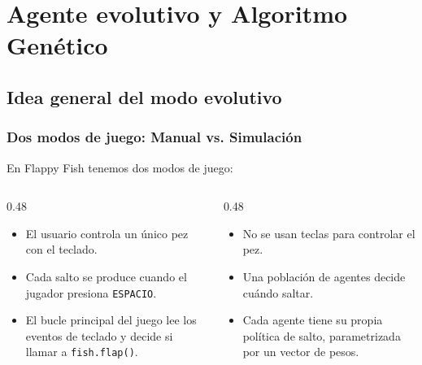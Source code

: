 \documentclass[
	11pt, %
]{beamer}
\begin{document}

\section{Agente evolutivo y Algoritmo Genético}


\subsection{Idea general del modo evolutivo}

\begin{frame}
\frametitle{Dos modos de juego: Manual vs. Simulación}

En Flappy Fish tenemos dos modos de juego:

\vspace{8pt}

\begin{columns}[T,onlytextwidth]
    \begin{column}{0.48\textwidth}
        \\[6pt]
        \raggedright
        \begin{itemize}
            \item El usuario controla un único pez con el teclado.
            \item Cada salto se produce cuando el jugador presiona \texttt{ESPACIO}.
            \item El bucle principal del juego lee los eventos de teclado
                  y decide si llamar a \texttt{fish.flap()}.
        \end{itemize}
    \end{column}

    \begin{column}{0.48\textwidth}
        \\[6pt]
        \raggedright
        \begin{itemize}
            \item No se usan teclas para controlar el pez.
            \item Una población de agentes decide cuándo saltar.
            \item Cada agente tiene su propia política de salto,
                  parametrizada por un vector de pesos.
        \end{itemize}
    \end{column}
\end{columns}

\end{frame}
\end{document}
